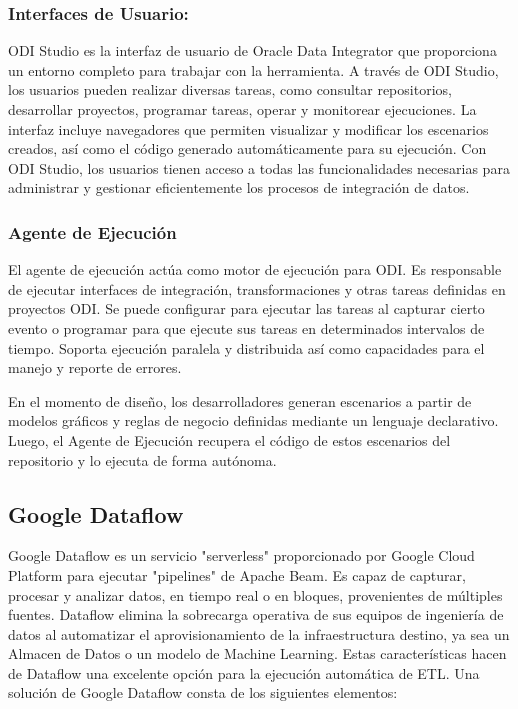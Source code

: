 \subsubsection{Interfaces de Usuario:}

ODI Studio es la interfaz de usuario de Oracle Data Integrator que proporciona un entorno completo para trabajar con la 
herramienta. A través de ODI Studio, los usuarios pueden realizar diversas tareas, como consultar repositorios, desarrollar 
proyectos, programar tareas, operar y monitorear ejecuciones. La interfaz incluye navegadores que permiten visualizar y 
modificar los escenarios creados, así como el código generado automáticamente para su ejecución. Con ODI Studio, los 
usuarios tienen acceso a todas las funcionalidades necesarias para administrar y gestionar eficientemente los procesos de 
integración de datos. 

\subsubsection{Agente de Ejecución}

El agente de ejecución actúa como motor de ejecución para ODI. Es responsable de ejecutar interfaces de integración, 
transformaciones y otras tareas definidas en proyectos ODI. Se puede configurar para ejecutar las tareas al capturar 
cierto evento o programar para que ejecute sus tareas en determinados intervalos de tiempo. Soporta ejecución paralela
y distribuida as\'i como capacidades para el manejo y reporte de errores.

En el momento de diseño, los desarrolladores generan escenarios a partir de modelos gr\'aficos y reglas de negocio 
definidas mediante un lenguaje declarativo. Luego, el Agente de Ejecución recupera el código de estos escenarios 
del repositorio y lo ejecuta de forma aut\'onoma. 





\subsection{Google Dataflow}

Google Dataflow es un servicio "serverless" proporcionado por Google Cloud Platform para ejecutar "pipelines" de Apache Beam. 
Es capaz de capturar, procesar y analizar datos, en tiempo real o en bloques, provenientes de m\'ultiples fuentes.
Dataflow elimina la sobrecarga operativa de sus equipos de ingeniería de datos al automatizar el aprovisionamiento de la
infraestructura destino, ya sea un Almacen de Datos o un modelo de Machine Learning. Estas caracter\'isticas hacen de 
Dataflow una excelente opci\'on para la ejecución automática de ETL. Una soluci\'on de Google Dataflow consta de los 
siguientes elementos:


